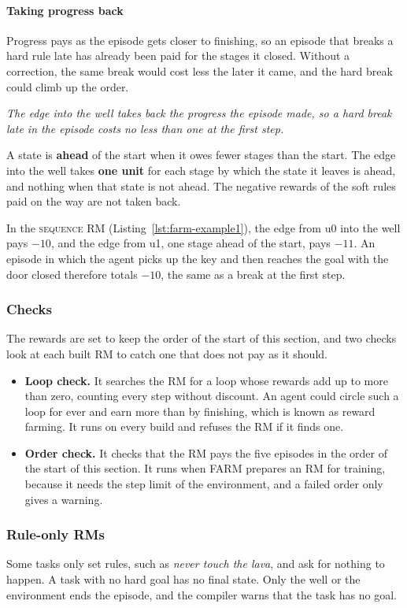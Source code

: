 \documentclass[11pt,english,listoffigures,listoftables]{tfgetsinf}
\newcommand{\runex}[1]{\textsc{#1}}  %
\newcommand{\keyidea}[1]{\par\smallskip\noindent\hspace*{0.6em}{\color{gray!55}\vrule width 1.5pt}\hspace{8pt}\parbox[t]{\dimexpr\linewidth-0.6em-9.5pt\relax}{\itshape #1}\par\smallskip}  %
\newcommand{\loss}[1]{\textcolor{red!60!black}{\bfseries\boldmath #1}}  %
\begin{document}
\paragraph{Taking progress back}
Progress pays as the episode gets closer to finishing, so an episode that breaks a hard rule late has already been paid for the stages it closed. Without a correction, the same break would cost less the later it came, and the hard break could climb up the order.

\keyidea{The edge into the well takes back the progress the episode made, so a hard break late in the episode costs no less than one at the first step.}
\noindent A state is \textbf{ahead} of the start when it owes fewer stages than the start. The edge into the well takes \loss{one unit} for each stage by which the state it leaves is ahead, and nothing when that state is not ahead. The negative rewards of the soft rules paid on the way are not taken back.

In the \runex{sequence} RM (Listing~\ref{lst:farm-example1}), the edge from u0 into the well pays \loss{$-10$}, and the edge from u1, one stage ahead of the start, pays \loss{$-11$}. An episode in which the agent picks up the key and then reaches the goal with the door closed therefore totals \loss{$-10$}, the same as a break at the first step.

\subsubsection{Checks}
The rewards are set to keep the order of the start of this section, and two checks look at each built RM to catch one that does not pay as it should.

\begin{itemize}
    \item \textbf{Loop check.} It searches the RM for a loop whose rewards add up to more than zero, counting every step without discount. An agent could circle such a loop for ever and earn more than by finishing, which is known as reward farming. It runs on every build and refuses the RM if it finds one.
    \item \textbf{Order check.} It checks that the RM pays the five episodes in the order of the start of this section. It runs when FARM prepares an RM for training, because it needs the step limit of the environment, and a failed order only gives a warning.
\end{itemize}

\subsubsection{Rule-only RMs}
\label{sec:rule-only}
Some tasks only set rules, such as \textit{never touch the lava}, and ask for nothing to happen. A task with no hard goal has no final state. Only the well or the environment ends the episode, and the compiler warns that the task has no goal. 
\end{document}
